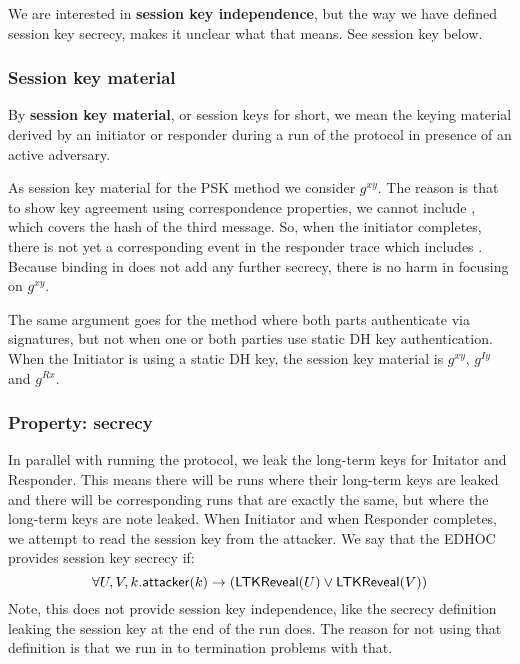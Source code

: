 \documentclass[a4paper,11pt]{article}
\theoremstyle{plain}
\theoremstyle{plain}
\begin{document}
We are interested in \textbf{session key independence}, but
the way we have defined session key secrecy, makes it unclear what that means.
%
See session key below.
%

\subsubsection{Session key material}
%
By \textbf{session key material}, or session keys for short,  we mean the
keying material derived by an initiator or responder during a run of the
protocol in presence of an active adversary.
%

As session key material for the PSK method we consider $g^{xy}$.
%
The reason is that to show key agreement using correspondence properties, we
cannot include , which covers the hash of the third message.
%
So, when the initiator completes, there is not yet a corresponding event in
the responder trace which includes .
%
Because binding in  does not add any further secrecy, there
is no harm in focusing on $g^{xy}$.
%

The same argument goes for the method where both parts authenticate via
signatures, but not when one or both parties use static DH key authentication.
%
When the Initiator is using a static DH key, the session key material is
$g^{xy}$, $g^{Iy}$ and $g^{Rx}$.
%
%
\subsubsection{Property: secrecy}
%
In parallel with running the protocol, we leak the long-term keys for Initator
and Responder.
%
This means there will be runs where their long-term keys are leaked and there
will be corresponding runs that are exactly the same, but where the long-term
keys are note leaked.
%
When Initiator and when Responder completes, we attempt to read the session
key from the attacker.
%
We say that the EDHOC provides session key secrecy if:
$$
\forall U, V, k.
    \text{\textup{\textsf{attacker}}}(k) \rightarrow
        (\text{\textup{\textsf{LTKReveal}}}(U) \lor \text{\textup{\textsf{LTKReveal}}}(V))
$$
Note, this does not provide session key independence, like the secrecy
definition leaking the session key at the end of the run does.
%
The reason for not using that definition is that we run in to termination
problems with that.
%
\end{document}
